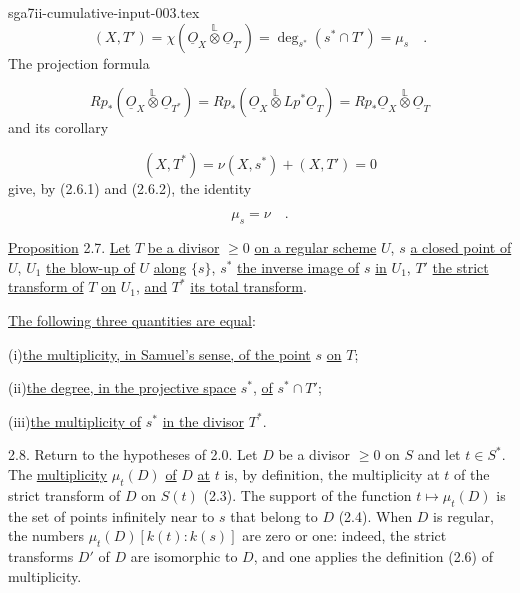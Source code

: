 \begin{filecontents*}{sga7ii-cumulative-input-003.tex}
\begin{equation}\tag{2.6.2}
(X,T')=
\chi(\underline{O}_X\overset{\mathbb L}{\otimes}\underline{O}_{T'})
=\deg_{s^*}(s^*\cap T')=\mu_s \quad .
\end{equation}
The projection formula

\begin{equation*}
Rp_*(\underline{O}_X\overset{\mathbb L}{\otimes}\underline{O}_{T^*})
=Rp_*(\underline{O}_X\overset{\mathbb L}{\otimes}Lp^*\underline{O}_T)
=Rp_*\underline{O}_X\overset{\mathbb L}{\otimes}\underline{O}_T
\end{equation*}
and its corollary

\begin{equation*}
(X,T^*)=\nu(X,s^*)+(X,T')=0
\end{equation*}
give, by (2.6.1) and (2.6.2), the identity

\begin{equation}\tag{2.6.3}
\mu_s=\nu \quad .
\end{equation}


\underline{Proposition} 2.7. \underline{Let} $T$ \underline{be a divisor}
$\geq0$ \underline{on a regular scheme} $U$, $s$ \underline{a closed point of}
$U$, $U_1$ \underline{the blow-up of} $U$ \underline{along} $\{s\}$, $s^*$
\underline{the inverse image of} $s$ \underline{in} $U_1$, $T'$ \underline{the
strict transform of} $T$ \underline{on} $U_1$, \underline{and} $T^*$
\underline{its total transform}.

\underline{The following three quantities are equal}:

(i)\quad \underline{the multiplicity, in Samuel's sense, of the point} $s$
\underline{on} $T$;

(ii)\quad \underline{the degree, in the projective space} $s^*$,
\underline{of} $s^*\cap T'$;

(iii)\quad \underline{the multiplicity of} $s^*$ \underline{in the divisor}
$T^*$.

2.8. Return to the hypotheses of 2.0.  Let $D$ be a divisor $\geq0$ on $S$ and
let $t\in S^*$.  The \underline{multiplicity} $\mu_t(D)$ \underline{of} $D$
\underline{at} $t$ is, by definition, the multiplicity at $t$ of the strict
transform of $D$ on $S(t)$ (2.3).  The support of the function
$t\mapsto\mu_t(D)$ is the set of points infinitely near to $s$ that belong to
$D$ (2.4).  When $D$ is regular, the numbers
$\mu_t(D)[k(t):k(s)]$ are zero or one: indeed, the strict transforms $D'$ of $D$
are isomorphic to $D$, and one applies the definition (2.6) of multiplicity.


\end{filecontents*}
